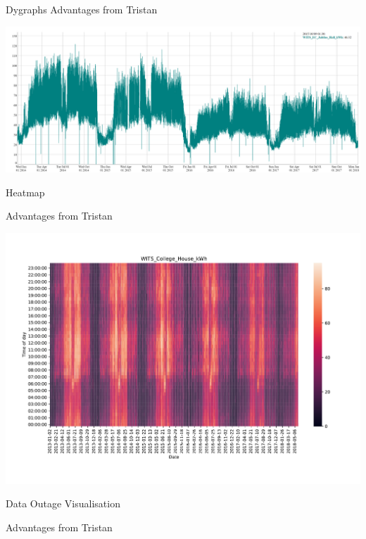 \documentclass[8pt,xcolor={dvipsnames}]{beamer}
\begin{document}
{\begin{frame}{Dygraphs}
	Advantages from Tristan
	
	\begin{center}
		\includegraphics[width=\textwidth, trim=0 0 0 0, clip]{DygraphsJubilee2014_2018}
	\end{center}
\end{frame}

\begin{frame}{Heatmap}

Advantages from Tristan

\begin{center}
	\includegraphics[width=\textwidth, trim=30 30 70 50, clip]{HeatMapCollegeHouse}
\end{center}
\end{frame}


\begin{frame}{Data Outage Visualisation}

Advantages from Tristan

\begin{center}
\end{center}
\end{frame}


}
\end{document}
